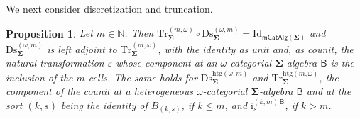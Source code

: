 \documentclass[a4paper, reqno]{amsbook}
\newcommand{\sig}[1]{\mathbf{#1}}             %
\newcommand{\calg}[1]{\boldsymbol{\mathsf{#1}}} %
\newcommand{\htg}{\mathrm{htg}}                %
\newcommand{\Id}{\mathrm{Id}}
\newcommand{\Ds}{\mathrm{Ds}}
\newcommand{\Tr}{\mathrm{Tr}}
\theoremstyle{plain}
\newtheorem{proposition}[theorem]{Proposition}
\theoremstyle{definition}
\begin{document}
We next consider discretization and truncation.

\begin{proposition}\label{PDsTrAdjOmega}
Let $m\in\mathbb{N}$.
Then $\Tr^{(m,\omega)}_{\sig{\Sigma}}\circ\Ds^{(\omega,m)}_{\sig{\Sigma}}=\Id_{\mathsf{mCatAlg}(\sig{\Sigma})}$ and $\Ds^{(\omega,m)}_{\sig{\Sigma}}$ is left adjoint to $\Tr^{(m,\omega)}_{\sig{\Sigma}}$, with the identity as unit and, as counit, the natural transformation $\varepsilon$ whose component at an $\omega$-categorial $\sig{\Sigma}$-algebra $\calg{B}$ is the inclusion of the $m$-cells.
The same holds for $\Ds^{\htg(\omega,m)}_{\sig{\Sigma}}$ and $\Tr^{\htg(m,\omega)}_{\sig{\Sigma}}$, the component of the counit at a heterogeneous $\omega$-categorial $\sig{\Sigma}$-algebra $\calg{B}$ and at the sort $(k,s)$ being the identity of $B_{(k,s)}$, if $k\leq m$, and $\mathrm{i}^{(k,m)\,\calg{B}}_{s}$, if $k>m$.
\end{proposition}
\end{document}
